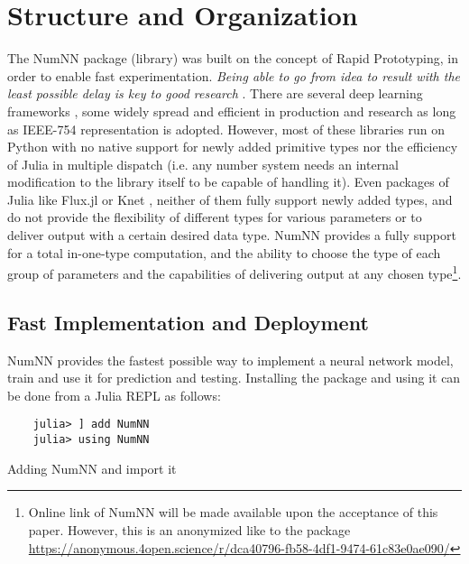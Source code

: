 \section{Structure and Organization}
The NumNN  package (library) was built on the concept of Rapid Prototyping, in order to enable fast experimentation. \emph{Being able to go from idea to result with the least possible delay is key to good research} \cite{Keras}. There are several deep learning frameworks \cite{Abadi2016,Collet2015,Jia2014,Paszke2017,PyTorch2019}, some widely spread and efficient in production and research as long as IEEE-754 representation is adopted. However, most of these libraries run on Python with no native support for newly added primitive types nor the efficiency of Julia in multiple dispatch (i.e. any number system needs an internal modification to the library itself to be capable of handling it). Even packages of Julia like Flux.jl \cite{Flux.jl-2018,Innes2018} or Knet \cite{Yuret2016k}, neither of them fully support newly added types, and do not provide the flexibility of different types for various parameters or to deliver output with a certain desired data type. NumNN provides a fully support for a total in-one-type computation, and the ability to choose the type of each group of parameters and the capabilities of delivering output at any chosen type\footnote{Online link of NumNN will be made available upon the acceptance  of this paper. However, this is an anonymized like to the package \url{https://anonymous.4open.science/r/dca40796-fb58-4df1-9474-61c83e0ae090/} }.

\subsection{Fast Implementation and Deployment}

NumNN provides the fastest possible way to implement a neural network model, train and use it for prediction and testing. Installing the package and using it can be done from a Julia REPL as follows:

\begin{listing}[H]
	\begin{verbatim}
	julia> ] add NumNN
	julia> using NumNN
	\end{verbatim}
	\caption{Adding NumNN and import it}\label{addimport}
\end{listing}

